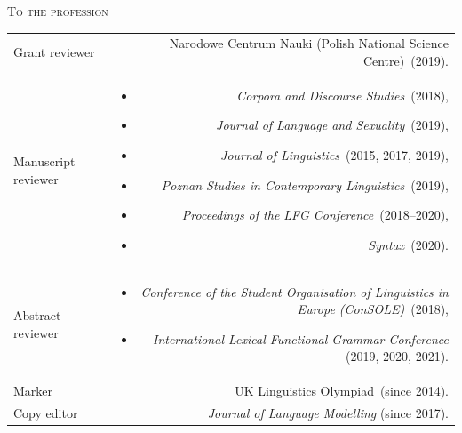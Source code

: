 \documentclass[11pt,a4paper]{article}
\makeatletter
\newlength{\rulelength}%
\newenvironment{cvsection}{%
  \setlength{\extrarowheight}{0.70ex}
  \begin{longtable}[l]{@{} L R @{}}
}{%
  \end{longtable}
}
\newlength{\squish}
\newenvironment{reviewlist}
{%
\vspace*{\squish}%
\begin{itemize}[noitemsep,label={},nosep,left=0pt .. \parindent]%
}
{%
\end{itemize}
}
\newcommand{\Label}[1]{%
\textnormal{#1}%
}
\newcommand{\cvheading}[1]{\noindent{{\color{oxfordblue}\rule[0.4ex]{\rulelength}{2pt}\hspace*{9pt} \Large #1}}\vspace*{0.5\baselineskip}}
\newcommand{\cvsubhead}[1]{\noindent\hspace*{\rulelength}\hspace*{9pt} \textsc{#1}\vspace*{0.25\baselineskip}}
\makeatother
\begin{document}
\cvheading{Service}

\cvsubhead{To the profession}
\begin{cvsection}
\Label{Grant reviewer} &
                    Narodowe Centrum Nauki (Polish National Science Centre)~(2019).\\
\Label{Manuscript reviewer} &
                \begin{reviewlist}
                \item \textit{Corpora and Discourse Studies}~(2018),
                \item \textit{Journal of Language and Sexuality}~(2019),
                \item \textit{Journal of Linguistics}~(2015, 2017, 2019),
                \item \textit{Poznan Studies in Contemporary Linguistics}~(2019),
                \item \textit{Proceedings of the LFG Conference}~(2018--2020),
                \item  \textit{Syntax}~(2020).
                \end{reviewlist}
                 \\[\squish]
\Label{Abstract reviewer}   &
                \begin{reviewlist}
                \item \textit{Conference of the Student Organisation of Linguistics in Europe (ConSOLE)}~(2018),
                \item \textit{International Lexical Functional Grammar Conference} (2019, 2020, 2021).
                \end{reviewlist}
                \\[\squish]
\Label{Marker}      & UK Linguistics Olympiad~(since 2014).\\
\Label{Copy editor} & \textit{Journal of Language Modelling} (since 2017).
\end{cvsection}
\end{document}
